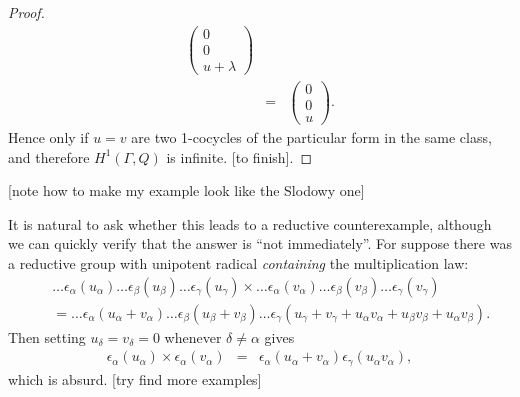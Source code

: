 \begin{proof}
\begin{eqnarray*}
		\left(\begin{matrix} 0 \\ 0 \\ u + \lambda\end{matrix}\right) \\
		&=&
		\left(\begin{matrix} 0 \\ 0 \\ u\end{matrix}\right).
	\end{eqnarray*}
	Hence only if $u=v$ are two 1-cocycles of the particular form in the same class, and therefore $H^1(\Gamma, Q)$ is infinite. [to finish].
\end{proof}
[note how to make my example look like the Slodowy one]

It is natural to ask whether this leads to a reductive counterexample, although we can quickly verify that the answer is ``not immediately''. For suppose there was a reductive group with unipotent radical \emph{containing} the multiplication law:
\begin{eqnarray*}
	&&\ldots \epsilon_\alpha(u_\alpha) \ldots \epsilon_\beta(u_\beta) \ldots \epsilon_\gamma(u_\gamma) \times
	\ldots \epsilon_\alpha(v_\alpha) \ldots \epsilon_\beta(v_\beta) \ldots \epsilon_\gamma(v_\gamma)\\
	&&=
	\ldots \epsilon_\alpha(u_\alpha + v_\alpha) \ldots \epsilon_\beta(u_\beta + v_\beta) \ldots \epsilon_\gamma(u_\gamma + v_\gamma + u_\alpha v_\alpha + u_\beta v_\beta + u_\alpha v_\beta).
\end{eqnarray*}
Then setting $u_\delta = v_\delta = 0$ whenever $\delta \neq \alpha$ gives
\begin{eqnarray*}
	\epsilon_\alpha(u_\alpha) \times \epsilon_\alpha(v_\alpha) &=& \epsilon_\alpha(u_\alpha + v_\alpha) \epsilon_\gamma(u_\alpha v_\alpha),
\end{eqnarray*}
which is absurd. [try find more examples]


